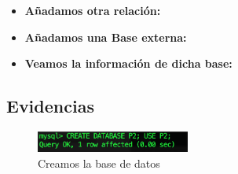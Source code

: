 \documentclass[12pt, fleqn]{article}                             %
\begin{document}
\begin{itemize}
\begin{itemize}
                    \lstset{basicstyle=\tiny}
                    

            \end{itemize}


        \item
            \textbf{Añadamos otra relación:}
            \lstset{basicstyle=\tiny}
            

        \clearpage

        \item
            \textbf{Añadamos una Base externa:}
            \lstset{basicstyle=\tiny}
            
            
        \item
            \textbf{Veamos la información de dicha base:}
            \lstset{basicstyle=\tiny}
            


    \end{itemize}



    \clearpage
    \subsection{Evidencias}

        \begin{figure}[h]
            \centering
            \includegraphics[width=0.45\textwidth]{BD2Reporte0}
            \caption{Creamos la base de datos}
        \end{figure}
\end{document}
